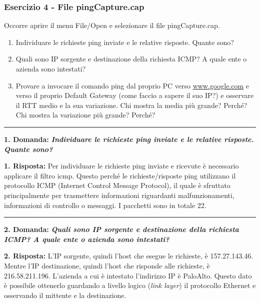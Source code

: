 \documentclass[a4paper]{article}
\newcommand{\longline}{\noindent\rule{\textwidth}{0.4pt}}
\begin{document}
	\subsubsection{Esercizio 4 - File \textsf{pingCapture.cap}}
	
	Occorre aprire il menu File/Open e selezionare il file \textsf{pingCapture.cap}.
	\begin{enumerate}
		\item Individuare le richieste ping inviate e le relative risposte. Quante sono?
		
		\item Quali sono IP sorgente e destinazione della richiesta ICMP? A quale ente o azienda sono intestati?
		
		\item Provare a invocare il comando \textsf{ping} dal proprio PC verso \url{www.google.com} e verso il proprio Default Gateway (come faccio a sapere il suo IP?) e osservare il RTT medio e la sua variazione. Chi mostra la media più grande? Perché? Chi mostra la variazione più grande? Perché?
	\end{enumerate}
	
	\longline\newline
	
	\noindent
	\textcolor{Red3}{\textbf{1. Domanda:}} \textbf{\emph{Individuare le richieste ping inviate e le relative risposte. Quante sono?}}\newline
	
	\noindent
	\textcolor{Green4}{\textbf{1. Risposta:}} Per individuare le richieste ping inviate e ricevute è necessario applicare il filtro \textsf{icmp}. Questo perché le richieste/risposte ping utilizzano il protocollo ICMP (Internet Control Message Protocol), il quale è sfruttato principalmente per trasmettere informazioni riguardanti malfunzionamenti, informazioni di controllo o messaggi. I pacchetti sono in totale 22.
	
	\noindent\longline\newline
	
	\noindent
	\textcolor{Red3}{\textbf{2. Domanda:}} \textbf{\emph{Quali sono IP sorgente e destinazione della richiesta ICMP? A quale ente o azienda sono intestati?}}\newline
	
	\noindent
	\textcolor{Green4}{\textbf{2. Risposta:}} L'IP sorgente, quindi l'host che esegue le richieste, è 157.27.143.46. Mentre l'IP destinazione, quindi l'host che risponde alle richieste, è 216.58.211.196. L'azienda a cui è intestato l'indirizzo IP è PaloAlto. Questo dato è possibile ottenerlo guardando a livello logico (\emph{link layer}) il protocollo Ethernet e osservando il mittente e la destinazione.
	
\end{document}
